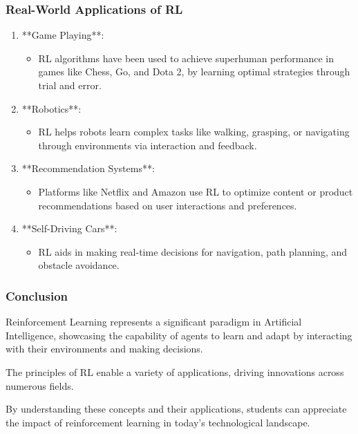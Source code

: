 \documentclass[aspectratio=169]{beamer}
\begin{document}
\begin{frame}[fragile]
    \frametitle{Real-World Applications of RL}
    \begin{enumerate}
        \item **Game Playing**:
            \begin{itemize}
                \item RL algorithms have been used to achieve superhuman performance in games like Chess, Go, and Dota 2, by learning optimal strategies through trial and error.
            \end{itemize}

        \item **Robotics**:
            \begin{itemize}
                \item RL helps robots learn complex tasks like walking, grasping, or navigating through environments via interaction and feedback.
            \end{itemize}

        \item **Recommendation Systems**:
            \begin{itemize}
                \item Platforms like Netflix and Amazon use RL to optimize content or product recommendations based on user interactions and preferences.
            \end{itemize}

        \item **Self-Driving Cars**:
            \begin{itemize}
                \item RL aids in making real-time decisions for navigation, path planning, and obstacle avoidance.
            \end{itemize}
    \end{enumerate}
\end{frame}

\begin{frame}[fragile]
    \frametitle{Conclusion}
    Reinforcement Learning represents a significant paradigm in Artificial Intelligence, showcasing the capability of agents to learn and adapt by interacting with their environments and making decisions. 

    The principles of RL enable a variety of applications, driving innovations across numerous fields. 

    By understanding these concepts and their applications, students can appreciate the impact of reinforcement learning in today's technological landscape.
\end{frame}
\end{document}
